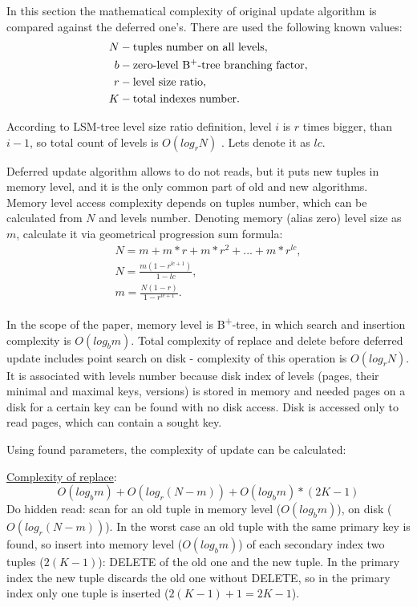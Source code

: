 \documentclass{vldb}
\begin{document}
In this section the mathematical complexity of original update algorithm is
compared against the deferred one's. There are used the following known values:
\begin{align*}
N &- \text{tuples number on all levels}, \\
b &- \text{zero-level B\textsuperscript{+}-tree branching factor}, \\
r &- \text{level size ratio}, \\
K &- \text{total indexes number}.
\end{align*}

According to LSM-tree level size ratio definition, level $i$ is $r$ times
bigger, than $i - 1$, so total count of levels is $O(log_rN)$
\cite{kai:slimdb}. Lets denote it as $lc$.

Deferred update algorithm allows to do not reads, but it puts new tuples in
memory level, and it is the only common part of old and new algorithms. Memory
level access complexity depends on tuples number, which can be calculated from
$N$ and levels number. Denoting memory (alias zero) level size as $m$, calculate
it via geometrical progression sum formula:
\begin{gather*}
N = m + m*r + m*r^2 + ... + m*r^{lc}, \\
N = \frac{m(1 - r^{lc+1})}{1 - lc}, \\
m = \frac{N(1 - r)}{1 - r^{lc + 1}}.
\end{gather*}

In the scope of the paper, memory level is B\textsuperscript{+}-tree, in which
search and insertion complexity is $O(log_bm)$.
Total complexity of replace and delete before deferred update includes point
search on disk - complexity of this operation is $O(log_rN)$. It is associated
with levels number because disk index of levels (pages, their minimal and
maximal keys, versions) is stored in memory and needed pages on a disk for a
certain key can be found with no disk access. Disk is accessed only to read
pages, which can contain a sought key.

Using found parameters, the complexity of update can be calculated:

\underline{Complexity of replace}:
\begin{displaymath}
O(log_bm) + O(log_r(N - m)) + O(log_bm) * (2K - 1)
\end{displaymath}
Do hidden read: scan for an old tuple in memory level ($O(log_bm)$), on
disk ($O(log_r(N - m))$). In the worst case an old tuple with the same primary
key is found, so insert into memory level ($O(log_bm)$) of each secondary index
two tuples ($2(K - 1)$): DELETE of the old one and the new tuple. In the primary
index the new tuple discards the old one without DELETE, so in the primary
index only one tuple is inserted ($2(K - 1) + 1 = 2K - 1$).
\end{document}
